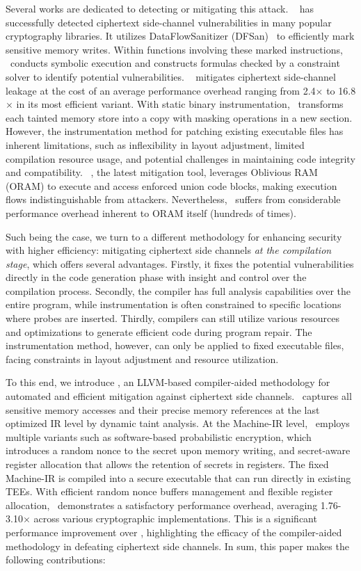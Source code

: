 Several works are dedicated to detecting or mitigating this attack. 
\htool~\cite{deng2023cipherh} has successfully detected ciphertext side-channel vulnerabilities in many popular cryptography libraries.
It utilizes DataFlowSanitizer (DFSan)~\cite{dfsan} to efficiently mark sensitive memory writes. 
Within functions involving these marked instructions, \htool\ conducts symbolic execution and constructs formulas checked by a constraint solver to identify potential vulnerabilities. 
\ftool~\cite{wichelmann2023cipherfix} mitigates ciphertext side-channel leakage at the cost of an average performance overhead ranging from 2.4$\times$ to 16.8$\times$ in its most efficient variant.
With static binary instrumentation, \ftool\ transforms each tainted memory store into a copy with masking operations in a new section.
However, the instrumentation method for patching existing executable files has inherent limitations, such as inflexibility in layout adjustment, limited compilation resource usage, and potential challenges in maintaining code integrity and compatibility. 
\otool~\cite{wichelmann2024obelix}, the latest mitigation tool, leverages Oblivious RAM (ORAM) to execute and access enforced union code blocks, making execution flows indistinguishable from attackers. 
Nevertheless, \otool\ suffers from considerable performance overhead inherent to ORAM itself (hundreds of times).

Such being the case, we turn to a different methodology for enhancing security with higher efficiency: mitigating ciphertext side channels \textit{at the compilation stage}, which offers several advantages.
Firstly, it fixes the potential vulnerabilities directly in the code generation phase with insight and control over the compilation process.
Secondly, the compiler has full analysis capabilities over the entire program, while instrumentation is often constrained to specific locations where probes are inserted.
Thirdly, compilers can still utilize various resources and optimizations to generate efficient code during program repair. The instrumentation method, however, can only be applied to fixed executable files, facing constraints in layout adjustment and resource utilization.

To this end, we introduce \tool, an LLVM-based compiler-aided methodology for automated and efficient mitigation against ciphertext side channels. 
\tool\ captures all sensitive memory accesses and their precise memory references at the last optimized IR level by dynamic taint analysis.
At the Machine-IR level, \tool\ employs multiple variants such as software-based probabilistic encryption, which introduces a random nonce to the secret upon memory writing, and secret-aware register allocation that allows the retention of secrets in registers. 
The fixed Machine-IR is compiled into a secure executable that can run directly in existing TEEs. 
With efficient random nonce buffers management and flexible register allocation, \tool\ demonstrates a satisfactory performance overhead, averaging 1.76-3.10$\times$ across various cryptographic implementations.
This is a significant performance improvement over \ftool, highlighting the efficacy of the compiler-aided methodology in defeating ciphertext side channels.
In sum, this paper makes the following contributions:

